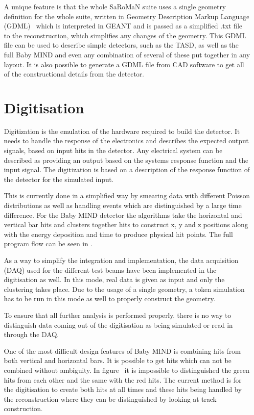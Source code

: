 A unique feature is that the whole SaRoMaN suite uses a single geometry definition for the whole suite, written in Geometry Description Markup Language (GDML)~\cite{GDML} which is interpreted in GEANT and is passed as a simplified .txt file to the reconstruction, which simplifies any changes of the geometry. This GDML file can be used to describe simple detectors, such as the TASD, as well as the full Baby MIND and even any combination of several of these put together in any layout. It is also possible to generate a GDML file from CAD software to get all of the constructional details from the detector.

\pagebreak
\section{Digitisation}
Digitization is the emulation of the hardware required to build the detector. It needs to handle the response of the electronics and describes the expected output signals, based on input hits in the detector. Any electrical system can be described as providing an output based on the systems response function and the input signal. The digitization is based on a description of the response function of the detector for the simulated input.

This is currently done in a simplified way by smearing data with different Poisson distributions as well as handling events which are distinguished by a large time difference. For the Baby MIND detector the algorithms take the horizontal and vertical bar hits and clusters together hits to construct x, y and z positions along with the energy deposition and time to produce physical hit points. The full program flow can be seen in .

As a way to simplify the integration and implementation, the data acquisition (DAQ) used for the different test beams have been implemented in the digitisation as well. In this mode, real data is given as input and only the clustering takes place. Due to the usage of a single geometry, a token simulation has to be run in this mode as well to properly construct the geometry.

To ensure that all further analysis is performed properly, there is no way to distinguish data coming out of the digitisation as being simulated or read in through the DAQ.

One of the most difficult design features of Baby MIND is combining hits from both vertical and horizontal bars. It is possible to get hits which can not be combined without ambiguity. In figure~ it is impossible to distinguished the green hits from each other and the same with the red hits. The current method is for the digitisation to create both hits at all times and these hits being handled by the reconstruction where they can be distinguished by looking at track construction.

